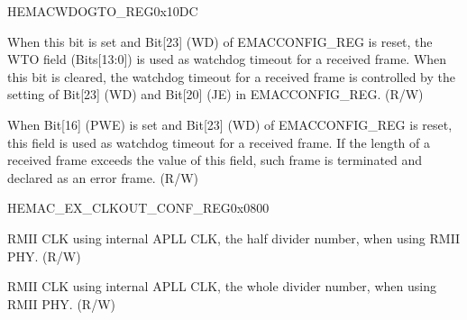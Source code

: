 \begin{register}{H}{EMACWDOGTO\_REG}{0x10DC}\label{regdesc:EMACWDOGTOREG}
%
%
%
%
\regnewline%
\begin{regdesc}\begin{reglist}
\item [PWDOGEN]When this bit is set and Bit[23] (WD) of EMACCONFIG\_REG is reset, the WTO field (Bits[13:0]) is used as watchdog timeout for a received frame. When this bit is cleared, the watchdog timeout for a received frame is controlled by the setting of Bit[23] (WD) and Bit[20] (JE) in EMACCONFIG\_REG. (R/W)
\item [WDOGTO]When Bit[16] (PWE) is set and Bit[23] (WD) of EMACCONFIG\_REG is reset, this field is used as watchdog timeout for a received frame. If the length of a received frame exceeds the value of this field, such frame is terminated and declared as an error frame. (R/W)
\end{reglist}\end{regdesc}
\end{register}

\begin{register}{H}{EMAC\_EX\_CLKOUT\_CONF\_REG}{0x0800}\label{regdesc:EMACEXCLKOUTCONFREG}
%
%
%
\regnewline%
\begin{regdesc}\begin{reglist}
\item [EMAC\_CLK\_OUT\_H\_DIV\_NUM]RMII CLK using internal APLL CLK, the half divider number, when using RMII PHY. (R/W)
\item [EMAC\_CLK\_OUT\_DIV\_NUM]RMII CLK using internal APLL CLK, the whole divider number, when using RMII PHY. (R/W)
\end{reglist}\end{regdesc}
\end{register}


